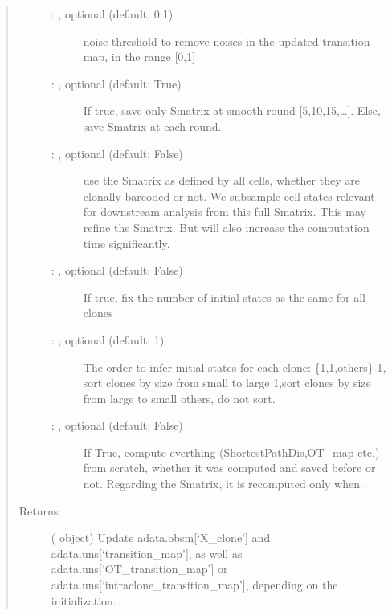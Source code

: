 \documentclass[letterpaper,10pt,english]{sphinxmanual}
\begin{document}
\begin{fulllineitems}
\begin{quote}
\begin{description}
\begin{description}
\item[{ : , optional (default: 0.1)}] \leavevmode
noise threshold to remove noises in the updated transition map,
in the range {[}0,1{]}

\item[{ : , optional (default: True)}] \leavevmode
If true, save only Smatrix at smooth round {[}5,10,15,…{]}.
Else, save Smatrix at each round.

\item[{ : , optional (default: False)}] \leavevmode
use the Smatrix as defined by all cells, whether they are clonally
barcoded or not. We sub\sphinxhyphen{}sample cell states relevant for downstream
analysis from this full Smatrix. This may refine the Smatrix.
But will also increase the computation time significantly.

\item[{ : , optional (default: False)}] \leavevmode
If true, fix the number of initial states as the same for all clones

\item[{ : , optional (default: 1)}] \leavevmode
The order to infer initial states for each clone: \{1,\sphinxhyphen{}1,others\}
1, sort clones by size from small to large
\sphinxhyphen{}1,sort clones by size from large to small
others, do not sort.

\item[{ : , optional (default: False)}] \leavevmode
If True, compute everthing (ShortestPathDis,OT\_map etc.) from scratch,
whether it was computed and saved before or not. Regarding the Smatrix, it is
recomputed only when .

\end{description}

\item[{Returns}] \leavevmode
{} ( object) \textendash{} Update adata.obsm{[}‘X\_clone’{]} and adata.uns{[}‘transition\_map’{]},
as well as adata.uns{[}‘OT\_transition\_map’{]} or
adata.uns{[}‘intraclone\_transition\_map’{]}, depending on the initialization.

\end{description}\end{quote}

\end{fulllineitems}
\end{document}
